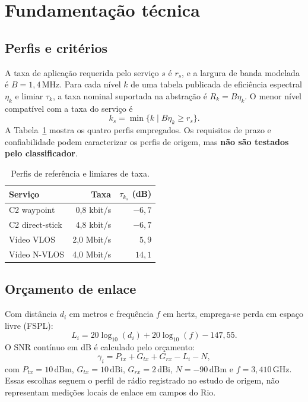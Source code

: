 \documentclass[10pt,a4paper,twocolumn]{article}
\begin{document}
\section{Fundamentação técnica}
\subsection{Perfis e critérios}
A taxa de aplicação requerida pelo serviço $s$ é $r_s$, e a largura de banda modelada é $B=1{,}4\,\mathrm{MHz}$. Para cada nível $k$ de uma tabela publicada de eficiência espectral $\eta_k$ e limiar $\tau_k$, a taxa nominal suportada na abstração é $R_k=B\eta_k$. O menor nível compatível com a taxa do serviço é
\begin{equation}
k_s=\min\{k\mid B\eta_k\geq r_s\}.
\end{equation}
A Tabela~\ref{tab:serv} mostra os quatro perfis empregados. Os requisitos de prazo e confiabilidade podem caracterizar os perfis de origem, mas \textbf{não são testados pelo classificador}.
\begin{table}[H]\centering\small\caption{Perfis de referência e limiares de taxa.}\label{tab:serv}\begin{tabular}{@{}lrr@{}}\toprule Serviço & Taxa & $\tau_{k_s}$ (dB)\\\midrule
C2 waypoint & 0,8 kbit/s & $-6{,}7$\\
C2 direct-stick & 4,8 kbit/s & $-6{,}7$\\
Vídeo VLOS & 2,0 Mbit/s & $5{,}9$\\
Vídeo N-VLOS & 4,0 Mbit/s & $14{,}1$\\\bottomrule\end{tabular}\end{table}
\subsection{Orçamento de enlace}
Com distância $d_i$ em metros e frequência $f$ em hertz, emprega-se perda em espaço livre (FSPL):
\begin{equation}
L_i=20\log_{10}(d_i)+20\log_{10}(f)-147{,}55.
\end{equation}
O SNR contínuo em dB é calculado pelo orçamento:
\begin{equation}
\gamma_i=P_{tx}+G_{tx}+G_{rx}-L_i-N,
\end{equation}
com $P_{tx}=10\,\mathrm{dBm}$, $G_{tx}=10\,\mathrm{dBi}$, $G_{rx}=2\,\mathrm{dBi}$, $N=-90\,\mathrm{dBm}$ e $f=3{,}410\,\mathrm{GHz}$. Essas escolhas seguem o perfil de rádio registrado no estudo de origem, não representam medições locais de enlace em campos do Rio.
\end{document}
